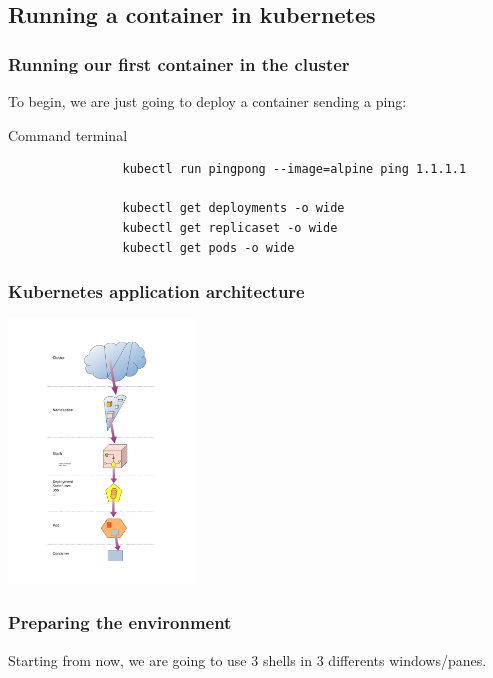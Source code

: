 \subsection{Running a container in kubernetes}	
		
	\begin{frame}[fragile]
		\frametitle{Running our first container in the cluster}
	
		To begin, we are just going to deploy a container sending a ping:
		\begin{block}{Command terminal}
			\begin{verbatim}
				kubectl run pingpong --image=alpine ping 1.1.1.1
				
				kubectl get deployments -o wide
				kubectl get replicaset -o wide
				kubectl get pods -o wide
			\end{verbatim}
		\end{block}
	\end{frame}
	
	\begin{frame}
		\frametitle{Kubernetes application architecture}
		
		\begin{center}
		\includegraphics[height=7cm]{../../../resources/color/fromCluster2container.pdf}
		\end{center}
		
	\end{frame}		

	\begin{frame}
		\frametitle{Preparing the environment}
		
		Starting from now, we are going to use 3 shells in 3 differents windows/panes.
		
	\end{frame}		

